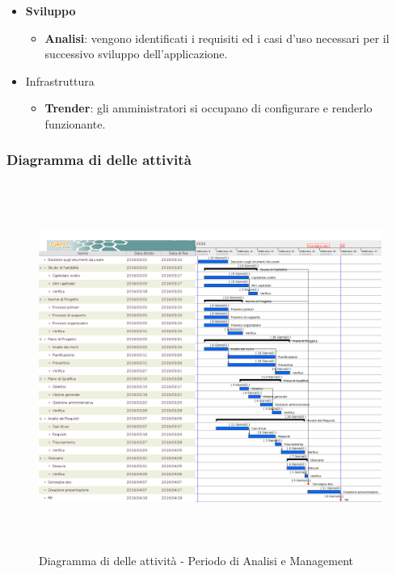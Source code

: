 \begin{itemize}
\begin{itemize}
		\end{itemize}
		\item \textbf{Sviluppo}
		\att
			\begin{itemize}
				\item \textbf{Analisi}: vengono identificati i requisiti ed i casi d'uso necessari per il successivo sviluppo dell'applicazione.
			\end{itemize}
		\item {Infrastruttura}
		\att 
		\begin{itemize}
			\item \textbf{Trender}: gli amministratori si occupano di configurare  e renderlo funzionante.
		\end{itemize}
	\end{itemize}
	
		
		\subsubsection{Diagramma di  delle attività}
		
		\begin{figure}[!h]
			\centering
			\includegraphics[height=12cm, width=15cm]{img/gantt/A} 
			\caption{Diagramma di  delle attività - Periodo di Analisi e Management}
		\end{figure}
		

